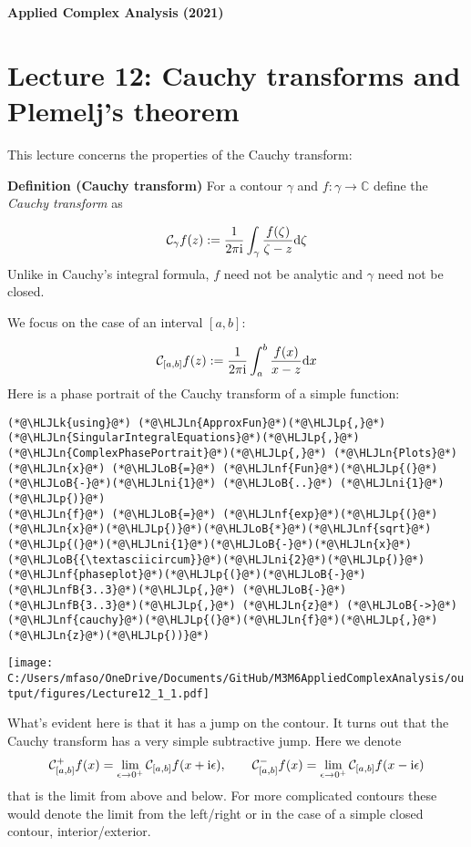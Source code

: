 \documentclass[12pt,landscape]{article}
\newcommand{\HLJLk}[1]{\textcolor[RGB]{148,91,176}{\textbf{#1}}}
\newcommand{\HLJLn}[1]{#1}
\newcommand{\HLJLnf}[1]{\textcolor[RGB]{66,102,213}{#1}}
\newcommand{\HLJLnfB}[1]{\textcolor[RGB]{59,151,46}{#1}}
\newcommand{\HLJLni}[1]{\textcolor[RGB]{59,151,46}{#1}}
\newcommand{\HLJLoB}[1]{\textcolor[RGB]{102,102,102}{\textbf{#1}}}
\newcommand{\HLJLp}[1]{#1}
\def\D{ {\rm d} }
\def\I{ {\rm i} }
\def\C{ {\mathbb C} }
\def\CC{ {\cal C} }
\def\dx{\D x}
\def\cent#1{\begin{center}#1\end{center} }
\begin{document}
{\LARGE
\sf
\textbf{Applied Complex Analysis (2021)}

\section{Lecture 12: Cauchy transforms and Plemelj's theorem}
This lecture concerns the properties of the Cauchy transform:

\textbf{Definition (Cauchy transform)} For a contour $\gamma$ and $f : \gamma \rightarrow \C$ define the \emph{Cauchy transform} as

\[
\CC_\gamma f(z) := {1 \over 2 \pi \I}\int_\gamma {f(\zeta) \over \zeta - z} \D \zeta
\]
Unlike in Cauchy's integral formula, $f$ need not be analytic and $\gamma$ need not be closed.

We focus on the case of an interval $[a,b]$:

\[
\CC_{[a,b]} f(z) := {1 \over 2 \pi \I} \int_a^b {f(x) \over x - z} \dx
\]
\newpage
Here is a phase portrait of the Cauchy transform of a simple function:


\begin{lstlisting}
(*@\HLJLk{using}@*) (*@\HLJLn{ApproxFun}@*)(*@\HLJLp{,}@*) (*@\HLJLn{SingularIntegralEquations}@*)(*@\HLJLp{,}@*) (*@\HLJLn{ComplexPhasePortrait}@*)(*@\HLJLp{,}@*) (*@\HLJLn{Plots}@*)
(*@\HLJLn{x}@*) (*@\HLJLoB{=}@*) (*@\HLJLnf{Fun}@*)(*@\HLJLp{(}@*)(*@\HLJLoB{-}@*)(*@\HLJLni{1}@*) (*@\HLJLoB{..}@*) (*@\HLJLni{1}@*)(*@\HLJLp{)}@*)
(*@\HLJLn{f}@*) (*@\HLJLoB{=}@*) (*@\HLJLnf{exp}@*)(*@\HLJLp{(}@*)(*@\HLJLn{x}@*)(*@\HLJLp{)}@*)(*@\HLJLoB{*}@*)(*@\HLJLnf{sqrt}@*)(*@\HLJLp{(}@*)(*@\HLJLni{1}@*)(*@\HLJLoB{-}@*)(*@\HLJLn{x}@*)(*@\HLJLoB{{\textasciicircum}}@*)(*@\HLJLni{2}@*)(*@\HLJLp{)}@*)
(*@\HLJLnf{phaseplot}@*)(*@\HLJLp{(}@*)(*@\HLJLoB{-}@*)(*@\HLJLnfB{3..3}@*)(*@\HLJLp{,}@*) (*@\HLJLoB{-}@*)(*@\HLJLnfB{3..3}@*)(*@\HLJLp{,}@*) (*@\HLJLn{z}@*) (*@\HLJLoB{->}@*) (*@\HLJLnf{cauchy}@*)(*@\HLJLp{(}@*)(*@\HLJLn{f}@*)(*@\HLJLp{,}@*)(*@\HLJLn{z}@*)(*@\HLJLp{))}@*)
\end{lstlisting}

\cent{\texttt{[image: C:/Users/mfaso/OneDrive/Documents/GitHub/M3M6AppliedComplexAnalysis/output/figures/Lecture12\_1\_1.pdf]}}

What's evident here is that it has a jump on the contour. It turns out that the Cauchy transform has a very simple subtractive jump. Here we denote
\[
    \CC_{[a,b]}^+ f(x) = \lim_{\epsilon \rightarrow 0^+} \CC_{[a,b]} f( x+ \I \epsilon), \qquad
        \CC_{[a,b]}^- f(x) = \lim_{\epsilon \rightarrow 0^+} \CC_{[a,b]} f( x- \I \epsilon)
\]
that is the limit from above and below. For more complicated contours these would denote the limit from the left/right or in the case of a simple closed contour, interior/exterior.

}
\end{document}
